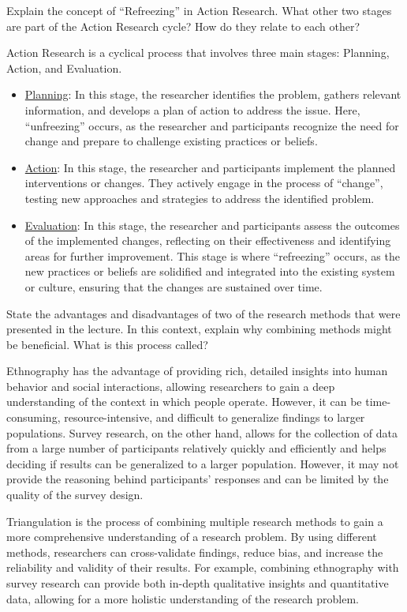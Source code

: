 \begin{ejercicio}
    Explain the concept of ``Refreezing'' in Action Research. What other two stages are part of the Action Research cycle? How do they relate to each other?

    Action Research is a cyclical process that involves three main stages: Planning, Action, and Evaluation.
    \begin{itemize}
        \item \ul{Planning}: In this stage, the researcher identifies the problem, gathers relevant information, and develops a plan of action to address the issue. Here, ``unfreezing'' occurs, as the researcher and participants recognize the need for change and prepare to challenge existing practices or beliefs.
        \item \ul{Action}: In this stage, the researcher and participants implement the planned interventions or changes. They actively engage in the process of ``change'', testing new approaches and strategies to address the identified problem.
        \item \ul{Evaluation}: In this stage, the researcher and participants assess the outcomes of the implemented changes, reflecting on their effectiveness and identifying areas for further improvement. This stage is where ``refreezing'' occurs, as the new practices or beliefs are solidified and integrated into the existing system or culture, ensuring that the changes are sustained over time.
    \end{itemize}
\end{ejercicio}

\begin{ejercicio}
    State the advantages and disadvantages of two of the research methods that were presented in the lecture. In this context, explain why combining methods might be beneficial. What is this process called?

    Ethnography has the advantage of providing rich, detailed insights into human behavior and social interactions, allowing researchers to gain a deep understanding of the context in which people operate. However, it can be time-consuming, resource-intensive, and difficult to generalize findings to larger populations. Survey research, on the other hand, allows for the collection of data from a large number of participants relatively quickly and efficiently and helps deciding if results can be generalized to a larger population. However, it may not provide the reasoning behind participants' responses and can be limited by the quality of the survey design.

    Triangulation is the process of combining multiple research methods to gain a more comprehensive understanding of a research problem. By using different methods, researchers can cross-validate findings, reduce bias, and increase the reliability and validity of their results. For example, combining ethnography with survey research can provide both in-depth qualitative insights and quantitative data, allowing for a more holistic understanding of the research problem.
\end{ejercicio}

